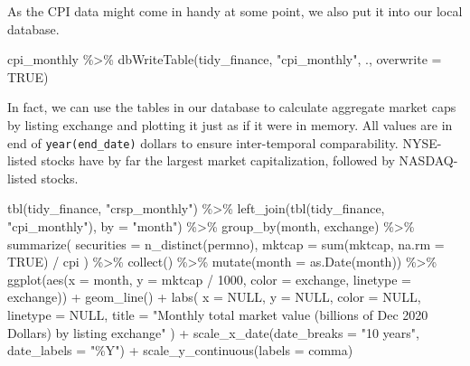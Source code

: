 \documentclass[
]{krantz}
\newenvironment{Shaded}{\begin{snugshade}}{\end{snugshade}}
\newcommand{\AttributeTok}[1]{\textcolor[rgb]{0.61,0.61,0.61}{#1}}
\newcommand{\ConstantTok}[1]{\textcolor[rgb]{0,0,0}{#1}}
\newcommand{\DecValTok}[1]{\textcolor[rgb]{0.06,0.06,0.06}{#1}}
\newcommand{\FunctionTok}[1]{\textcolor[rgb]{0,0,0}{#1}}
\newcommand{\NormalTok}[1]{#1}
\newcommand{\SpecialCharTok}[1]{\textcolor[rgb]{0,0,0}{#1}}
\newcommand{\StringTok}[1]{\textcolor[rgb]{0.5,0.5,0.5}{#1}}
\begin{document}
As the CPI data might come in handy at some point, we also put it into our local database.

\begin{Shaded}
\begin{Highlighting}[]
\NormalTok{cpi\_monthly }\SpecialCharTok{\%\textgreater{}\%}
  \FunctionTok{dbWriteTable}\NormalTok{(tidy\_finance, }\StringTok{"cpi\_monthly"}\NormalTok{, ., }\AttributeTok{overwrite =} \ConstantTok{TRUE}\NormalTok{)}
\end{Highlighting}
\end{Shaded}

In fact, we can use the tables in our database to calculate aggregate market caps by listing exchange and plotting it just as if it were in memory. All values are in end of \texttt{year(end\_date)} dollars to ensure inter-temporal comparability. NYSE-listed stocks have by far the largest market capitalization, followed by NASDAQ-listed stocks.

\begin{Shaded}
\begin{Highlighting}[]
\FunctionTok{tbl}\NormalTok{(tidy\_finance, }\StringTok{"crsp\_monthly"}\NormalTok{) }\SpecialCharTok{\%\textgreater{}\%}
  \FunctionTok{left\_join}\NormalTok{(}\FunctionTok{tbl}\NormalTok{(tidy\_finance, }\StringTok{"cpi\_monthly"}\NormalTok{), }\AttributeTok{by =} \StringTok{"month"}\NormalTok{) }\SpecialCharTok{\%\textgreater{}\%}
  \FunctionTok{group\_by}\NormalTok{(month, exchange) }\SpecialCharTok{\%\textgreater{}\%}
  \FunctionTok{summarize}\NormalTok{(}
    \AttributeTok{securities =} \FunctionTok{n\_distinct}\NormalTok{(permno),}
    \AttributeTok{mktcap =} \FunctionTok{sum}\NormalTok{(mktcap, }\AttributeTok{na.rm =} \ConstantTok{TRUE}\NormalTok{) }\SpecialCharTok{/}\NormalTok{ cpi}
\NormalTok{  ) }\SpecialCharTok{\%\textgreater{}\%}
  \FunctionTok{collect}\NormalTok{() }\SpecialCharTok{\%\textgreater{}\%}
  \FunctionTok{mutate}\NormalTok{(}\AttributeTok{month =} \FunctionTok{as.Date}\NormalTok{(month)) }\SpecialCharTok{\%\textgreater{}\%}
  \FunctionTok{ggplot}\NormalTok{(}\FunctionTok{aes}\NormalTok{(}\AttributeTok{x =}\NormalTok{ month, }\AttributeTok{y =}\NormalTok{ mktcap }\SpecialCharTok{/} \DecValTok{1000}\NormalTok{, }\AttributeTok{color =}\NormalTok{ exchange, }\AttributeTok{linetype =}\NormalTok{ exchange)) }\SpecialCharTok{+}
  \FunctionTok{geom\_line}\NormalTok{() }\SpecialCharTok{+}
  \FunctionTok{labs}\NormalTok{(}
    \AttributeTok{x =} \ConstantTok{NULL}\NormalTok{, }\AttributeTok{y =} \ConstantTok{NULL}\NormalTok{, }\AttributeTok{color =} \ConstantTok{NULL}\NormalTok{, }\AttributeTok{linetype =} \ConstantTok{NULL}\NormalTok{,}
    \AttributeTok{title =} \StringTok{"Monthly total market value (billions of Dec 2020 Dollars) by listing exchange"}
\NormalTok{  ) }\SpecialCharTok{+}
  \FunctionTok{scale\_x\_date}\NormalTok{(}\AttributeTok{date\_breaks =} \StringTok{"10 years"}\NormalTok{, }\AttributeTok{date\_labels =} \StringTok{"\%Y"}\NormalTok{) }\SpecialCharTok{+}
  \FunctionTok{scale\_y\_continuous}\NormalTok{(}\AttributeTok{labels =}\NormalTok{ comma)}
\end{Highlighting}
\end{Shaded}
\end{document}
